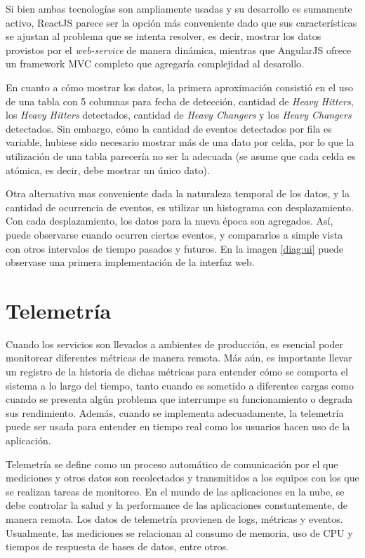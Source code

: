 \documentclass[a4paper,10pt, oneside]{article}
\begin{document}
Si bien ambas tecnologías son ampliamente usadas y su desarrollo es sumamente activo, ReactJS parece ser la opción más conveniente dado que sus características se ajustan al problema que se intenta resolver, es decir, mostrar los datos provistos por el \textit{web-service} de manera dinámica, mientras que AngularJS ofrece un framework MVC completo que agregaría complejidad al desarollo.

En cuanto a cómo mostrar los datos, la primera aproximación consistió en el uso de una tabla con 5 columnas para fecha de detección, cantidad de \textit{Heavy Hitters}, los \textit{Heavy Hitters} detectados, cantidad de \textit{Heavy Changers} y los \textit{Heavy Changers} detectados. Sin embargo, cómo la cantidad de eventos detectados por fila es variable, hubiese sido necesario mostrar más de una dato por celda, por lo que la utilización de una tabla parecería no ser la adecuada (se asume que cada celda es atómica, es decir, debe mostrar un único dato).

Otra alternativa mas conveniente dada la naturaleza temporal de los datos, y la cantidad de ocurrencia de eventos, es utilizar un histograma con desplazamiento. Con cada desplazamiento, los datos para la nueva época son agregados. Así, puede observarse cuando ocurren ciertos eventos, y compararlos a simple vista con otros intervalos de tiempo pasados y futuros. En la imagen \ref{diag:ui} puede observase una primera implementación de la interfaz web.


\newpage

\section{Telemetría}
Cuando los servicios son llevados a ambientes de producción, es esencial poder monitorear diferentes métricas de manera remota. Más aún, es importante llevar un registro de la historia de dichas métricas para entender cómo se comporta el sistema a lo largo del tiempo, tanto cuando es sometido a diferentes cargas como cuando se presenta algún problema que interrumpe su funcionamiento o degrada sus rendimiento. Además, cuando se implementa adecuadamente, la telemetría puede ser usada para entender en tiempo real como los usuarios hacen uso de la aplicación.

Telemetría se define como un proceso automático de comunicación por el que mediciones y otros datos son recolectados y transmitidos a los equipos con los que se realizan tareas de monitoreo. En el mundo de las aplicaciones en la nube, se debe controlar la salud y la performance de las aplicaciones constantemente, de manera remota. Los datos de telemetría provienen de logs, métricas y eventos. Usualmente, las mediciones se relacionan al consumo de memoria, uso de CPU y tiempos de respuesta de bases de datos, entre otros.
\end{document}

